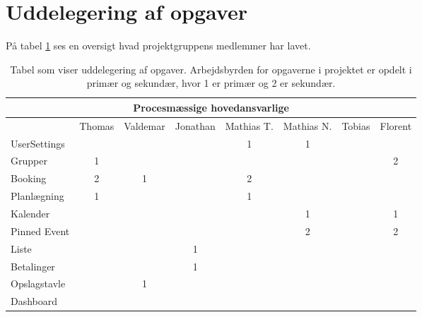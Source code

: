 \section{Uddelegering af opgaver}

På tabel \ref{tb:ansvars_omraader} ses en oversigt hvad projektgruppens medlemmer har lavet.

\begin{table}[H]
    \centering
    \begin{tabular}{|p{0.8in}|p{0.5in}|p{0.6in}|p{0.5in}|p{0.7in}|p{0.7in}|p{0.4in}|p{0.4in}|} \hline 
        \multicolumn{8}{|c|}{\textbf{Procesmæssige hovedansvarlige}} \\ \hline 
         & Thomas & Valdemar & Jonathan & Mathias T. & Mathias N. & Tobias & Florent \\ \hline 
        UserSettings &  &  &  & \multicolumn{1}{|c|}{1} & \multicolumn{1}{|c|}{1} &  &  \\ \hline 
        Grupper & \multicolumn{1}{|c|}{1} &  &  &  &  &  & \multicolumn{1}{|c|}{2} \\ \hline 
        Booking & \multicolumn{1}{|c|}{2} & \multicolumn{1}{|c|}{1} &  & \multicolumn{1}{|c|}{2} &  &  &  \\ \hline 
        Planlægning & \multicolumn{1}{|c|}{1} &  &  & \multicolumn{1}{|c|}{1} &  &  &  \\ \hline 
        Kalender &  &  &  &  & \multicolumn{1}{|c|}{1} &  & \multicolumn{1}{|c|}{1} \\ \hline 
        Pinned Event &  &  &  &  & \multicolumn{1}{|c|}{2} & & \multicolumn{1}{|c|}{2} \\ \hline 
        Liste &  &  & \multicolumn{1}{|c|}{1} &  &  &  &  \\ \hline 
        Betalinger &  &  & \multicolumn{1}{|c|}{1} &  &  &  &  \\ \hline 
        Opslagstavle &  & \multicolumn{1}{|c|}{1} &  &  &  &  &  \\ \hline 
        Dashboard &  &  &  &  &  &  &  \\ \hline 
    \end{tabular}
    \caption{Tabel som viser uddelegering af opgaver. Arbejdsbyrden for opgaverne i projektet er opdelt i primær og sekundær, hvor 1 er primær og 2 er sekundær.}
    \label{tb:ansvars_omraader}
\end{table}